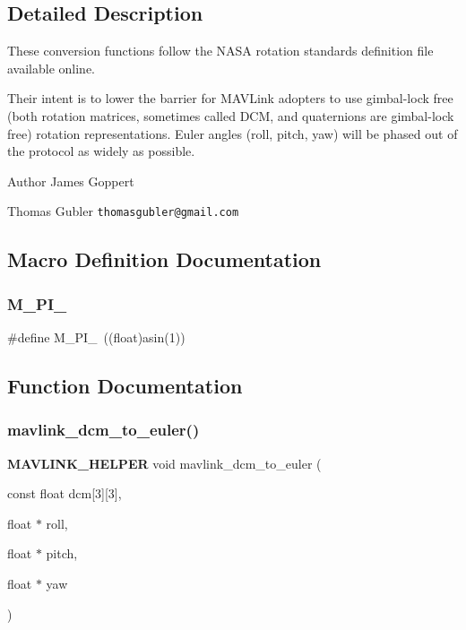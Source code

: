 \subsection{Detailed Description}
These conversion functions follow the N\+A\+SA rotation standards definition file available online.

Their intent is to lower the barrier for M\+A\+V\+Link adopters to use gimbal-\/lock free (both rotation matrices, sometimes called D\+CM, and quaternions are gimbal-\/lock free) rotation representations. Euler angles (roll, pitch, yaw) will be phased out of the protocol as widely as possible.

\begin{DoxyAuthor}{Author}
James Goppert 

Thomas Gubler {\tt thomasgubler@gmail.\+com} 
\end{DoxyAuthor}


\subsection{Macro Definition Documentation}
\mbox{\label{mavlink__conversions_8h_a958e4508ed28ee5cc04249144312c15f}} 
\subsubsection{M\+\_\+\+P\+I\+\_}
{\footnotesize\ttfamily \#define M\+\_\+\+P\+I\+\_~((float)asin(1))}



\subsection{Function Documentation}
\mbox{\label{mavlink__conversions_8h_a034c8265f27e81fa17cf4cf483b7ad8c}} 
\subsubsection{mavlink\+\_\+dcm\+\_\+to\+\_\+euler()}
{\footnotesize\ttfamily \textbf{ M\+A\+V\+L\+I\+N\+K\+\_\+\+H\+E\+L\+P\+ER} void mavlink\+\_\+dcm\+\_\+to\+\_\+euler (\begin{DoxyParamCaption}\item[{const float}]{dcm[3][3],  }\item[{float $\ast$}]{roll,  }\item[{float $\ast$}]{pitch,  }\item[{float $\ast$}]{yaw }\end{DoxyParamCaption})}

